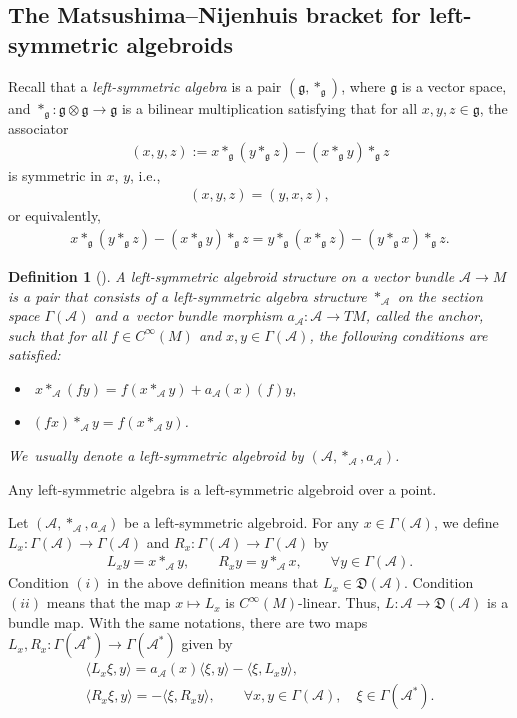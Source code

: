 \documentclass[pdftex]{sigma}%
\numberwithin{equation}{section}
\newtheorem{defi}[thm]{Definition}
\newcommand{\g}{\mathfrak g}
\newcommand{\huaA}{\mathcal{A}}
\newcommand{\frkD}{\mathfrak D}
\newcommand{\frkg}{\mathfrak g}
\newcommand{\CWM}{C^{\infty}(M)}
\begin{document}
\subsection{The Matsushima--Nijenhuis bracket for left-symmetric algebroids}

Recall that a {\it left-symmetric algebra} is a pair $(\frkg,\ast_\frkg)$, where $\g$ is a vector space, and $\ast_\frkg\colon \g\otimes \g\longrightarrow\g$ is a bilinear multiplication
satisfying that for all $x,y,z\in \g$, the associator
\begin{gather*}%
(x,y,z):= x\ast_\frkg(y\ast_\frkg z)-(x\ast_\frkg y)\ast_\frkg z
\end{gather*} is symmetric in $x$, $y$,
i.e.,
\begin{gather*}
(x,y,z)=(y,x,z),
\end{gather*}
or equivalently,
\begin{gather*}
x\ast_\frkg(y\ast_\frkg z)-(x\ast_\frkg y)\ast_\frkg z=y\ast_\frkg(x\ast_\frkg z)-(y\ast_\frkg x)\ast_\frkg z.
\end{gather*}

\begin{defi}[\cite{LiuShengBaiChen,Boyom1}]%
A {\it left-symmetric algebroid} structure on a vector bundle
$\huaA\longrightarrow M$ is a pair that consists of a left-symmetric
algebra structure $\ast_\huaA$ on the section space $\Gamma(\huaA)$ and a~vector bundle morphism $a_\huaA\colon \huaA\longrightarrow TM$, called the anchor,
such that for all $f\in\CWM$ and $x,y\in\Gamma(\huaA)$, the following
conditions are satisfied:
\begin{itemize}\itemsep=0pt
\item[$(i)$]$~x\ast_\huaA(fy)=f(x\ast_\huaA y)+a_\huaA(x)(f)y,$
\item[$(ii)$] $(fx)\ast_\huaA y=f(x\ast_\huaA y)$.
\end{itemize}
We~usually denote a left-symmetric algebroid by $(\huaA,\ast_\huaA, a_\huaA)$.
\end{defi}
Any left-symmetric algebra is a left-symmetric algebroid over a point.

Let $(\huaA,\ast_\huaA, a_\huaA)$ be a left-symmetric algebroid. For any $x\in\Gamma(\huaA)$, we define
$L_x\colon \Gamma(\huaA)\longrightarrow\Gamma(\huaA)$ and $R_x\colon \Gamma(\huaA)\longrightarrow\Gamma(\huaA)$ by
\begin{gather*}%
L_xy=x\ast_\huaA y,\qquad
R_xy=y\ast_\huaA x,\qquad
\forall y\in\Gamma(\huaA).
\end{gather*}
Condition $(i)$ in the above definition means that $L_x\in \frkD(\huaA)$.
Condition $(ii)$ means that the map $x\longmapsto L_x$ is
$C^\infty(M)$-linear. Thus, $L\colon \huaA\longrightarrow \frkD(\huaA)$ is a bundle
map. With the same notations, there are two maps $L_x,R_x\colon \Gamma(\huaA^*)\longrightarrow\Gamma(\huaA^*)$ given by
\begin{gather}
\langle L_x \xi,y\rangle=a_\huaA(x)\langle\xi,y\rangle-\langle \xi,L_x y\rangle,\nonumber
\\
\langle R_x \xi,y\rangle=-\langle \xi,R_x y\rangle,\qquad
\forall x,y\in\Gamma(\huaA),\quad \xi\in\Gamma(\huaA^*).\label{eq:dualLR}
\end{gather}
\end{document}
